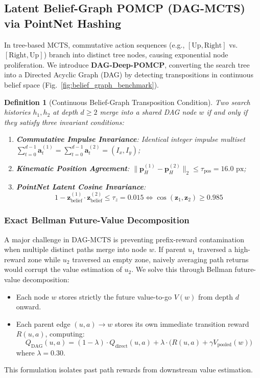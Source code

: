 \documentclass[conference]{IEEEtran}
\newtheorem{definition}{Definition}
\begin{document}
\subsection{Latent Belief-Graph POMCP (DAG-MCTS) via PointNet Hashing}
In tree-based MCTS, commutative action sequences (e.g., $[\text{Up}, \text{Right}]$ vs. $[\text{Right}, \text{Up}]$) branch into distinct tree nodes, causing exponential node proliferation. We introduce \textbf{DAG-Deep-POMCP}, converting the search tree into a Directed Acyclic Graph (DAG) by detecting transpositions in continuous belief space (Fig.~\ref{fig:belief_graph_benchmark}).

\begin{definition}[Continuous Belief-Graph Transposition Condition]
Two search histories $h_1, h_2$ at depth $d \ge 2$ merge into a shared DAG node $w$ if and only if they satisfy three invariant conditions:
\begin{enumerate}
    \item \textbf{Commutative Impulse Invariance}: Identical integer impulse multiset $\sum_{t=0}^{d-1} \mathbf{a}_t^{(1)} = \sum_{t=0}^{d-1} \mathbf{a}_t^{(2)} = (I_x, I_y)$;
    \item \textbf{Kinematic Position Agreement}: $\|\mathbf{p}_{H}^{(1)} - \mathbf{p}_{H}^{(2)}\|_2 \le \tau_{\text{pos}} = 16.0\text{ px}$;
    \item \textbf{PointNet Latent Cosine Invariance}:
    \begin{equation}
        1 - \mathbf{z}_{\text{belief}}^{(1)} \cdot \mathbf{z}_{\text{belief}}^{(2)} \le \tau_z = 0.015 \iff \cos(\mathbf{z}_1, \mathbf{z}_2) \ge 0.985
    \end{equation}
\end{enumerate}
\end{definition}

\subsubsection{Exact Bellman Future-Value Decomposition}
A major challenge in DAG-MCTS is preventing prefix-reward contamination when multiple distinct paths merge into node $w$. If parent $u_1$ traversed a high-reward zone while $u_2$ traversed an empty zone, naively averaging path returns would corrupt the value estimation of $u_2$. We solve this through Bellman future-value decomposition:
\begin{itemize}
    \item Each node $w$ stores strictly the future value-to-go $V(w)$ from depth $d$ onward.
    \item Each parent edge $(u, a) \to w$ stores its own immediate transition reward $R(u, a)$, computing:
    \begin{equation}
        Q_{\text{DAG}}(u, a) = (1 - \lambda) \cdot Q_{\text{direct}}(u, a) + \lambda \cdot \big(R(u, a) + \gamma V_{\text{pooled}}(w)\big)
    \end{equation}
    where $\lambda = 0.30$.
\end{itemize}
This formulation isolates past path rewards from downstream value estimation.
\end{document}
